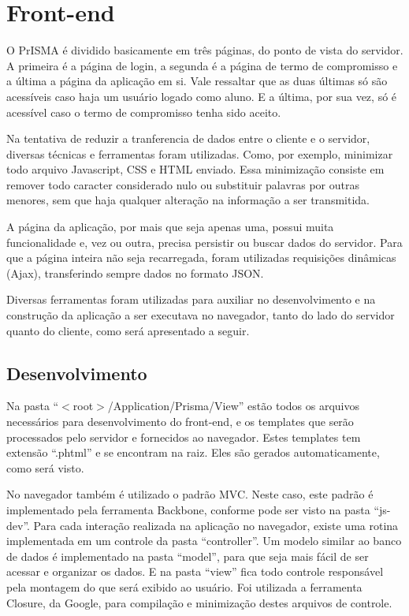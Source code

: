 \documentclass[graduacao,brazil]{ThesisPUC}
\begin{document}
\section{Front-end}

O PrISMA é dividido basicamente em três páginas, do ponto de vista do servidor. A primeira é a página de login, a segunda é a página de termo de compromisso e a última a página da aplicação em si. Vale ressaltar que as duas últimas só são acessíveis caso haja um usuário logado como aluno. E a última, por sua vez, só é acessível caso o termo de compromisso tenha sido aceito.

Na tentativa de reduzir a tranferencia de dados entre o cliente e o servidor, diversas técnicas e ferramentas foram utilizadas. Como, por exemplo, minimizar todo arquivo Javascript, CSS e HTML enviado. Essa minimização consiste em remover todo caracter considerado nulo ou substituir palavras por outras menores, sem que haja qualquer alteração na informação a ser transmitida.

A página da aplicação, por mais que seja apenas uma, possui muita funcionalidade e, vez ou outra, precisa persistir ou buscar dados do servidor. Para que a página inteira não seja recarregada, foram utilizadas requisições dinâmicas (Ajax), transferindo sempre dados no formato JSON.

Diversas ferramentas foram utilizadas para auxiliar no desenvolvimento e na construção da aplicação a ser executava no navegador, tanto do lado do servidor quanto do cliente, como será apresentado a seguir.

\newpage
\subsection{Desenvolvimento}

Na pasta “$<$root$>$/Application/Prisma/View” estão todos os arquivos necessários para desenvolvimento do front-end, e os templates que serão processados pelo servidor e fornecidos ao navegador. Estes templates tem extensão “.phtml” e se encontram na raiz. Eles são gerados automaticamente, como será visto.

No navegador também é utilizado o padrão MVC. Neste caso, este padrão é implementado pela ferramenta Backbone\cite{Backbone}, conforme pode ser visto na pasta “js-dev”. Para cada interação realizada na aplicação no navegador, existe uma rotina implementada em um controle da pasta “controller”. Um modelo similar ao banco de dados é implementado na pasta “model”, para que seja mais fácil de ser acessar e organizar os dados. E na pasta “view” fica todo controle responsável pela montagem do que será exibido ao usuário. Foi utilizada a ferramenta Closure\cite{Closure}, da Google, para compilação e minimização destes arquivos de controle.
\end{document}

